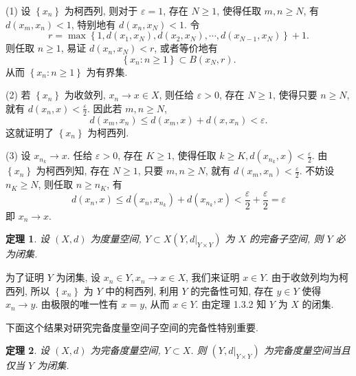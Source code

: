 \documentclass[openany]{ctexbook}
\makeatletter
\theoremstyle{kaiti}
\newtheorem{theorem}{定理}[section]
\theoremstyle{normal}
\renewenvironment{proof}[1][\proofname]{\par
    \pushQED{\qed}%
    \normalfont \topsep6\p@\@plus6\p@\relax
    \trivlist
    \item\relax
    {\heiti #1}\hspace{2\labelsep}\ignorespaces
  }{%
    \popQED\endtrivlist\@endpefalse
  }
\makeatother
\begin{document}
\begin{proof}
(1) 设 $\left\{x_n\right\}$ 为柯西列, 则对于 $\varepsilon=1$, 存在 $N \geqslant 1$, 使得任取 $m, n \geqslant N$, 有 $d\left(x_m, x_n\right)<1$, 特别地有 $d\left(x_n, x_{N}\right)<1$. 令
$$
r=\max\left\{1, d\left(x_1, x_{N}\right), d\left(x_2, x_{N}\right), \cdots, d\left(x_{N-1}, x_{N}\right)\right\}+1.
$$
则任取 $n \geqslant 1$, 易证 $d\left(x_n, x_{N}\right)<r$, 或者等价地有
$$
\left\{x_n: n \geqslant 1\right\} \subset B\left(x_{N}, r\right).
$$
从而 $\left\{x_n: n \geqslant 1\right\}$ 为有界集.

(2) 若 $\left\{x_n\right\}$ 为收敛列, $x_n \rightarrow x \in X$, 则任给 $\varepsilon>0$, 存在 $N \geqslant 1$, 使得只要 $n \geqslant N$, 就有 $d\left(x_n, x\right)<\frac{\varepsilon}{2}$. 因此若 $m, n \geqslant N$,
$$
d\left(x_m, x_n\right) \leqslant d\left(x_m, x\right)+d\left(x, x_n\right)<\varepsilon.
$$
这就证明了 $\left\{x_n\right\}$ 为柯西列.

(3) 设 $x_{n_{k}} \rightarrow x$. 任给 $\varepsilon>0$, 存在 $K \geqslant 1$, 使得任取 $k \geqslant K, d\left(x_{n_{k}}, x\right)<\frac{\varepsilon}{2}$. 由 $\left\{x_n\right\}$ 为柯西列知, 存在 $N \geqslant 1$, 只要 $m, n \geqslant N$, 就有 $d\left(x_m, x_n\right)<\frac{\varepsilon}{2}$. 不妨设 $n_{K} \geqslant N$, 则任取 $n \geqslant n_{K}$, 有
$$
d\left(x_n, x\right) \leqslant d\left(x_n, x_{n_{k}}\right)+d\left(x_{n_{k}}, x\right)<\frac{\varepsilon}{2}+\frac{\varepsilon}{2}=\varepsilon
$$
即 $x_n \rightarrow x$.
\end{proof}

\begin{theorem}
  设 $(X, d)$ 为度量空间, $Y \subset X\left(Y,\left.d\right|_{Y \times Y}\right)$ 为 $X$ 的完备子空间, 则 $Y$ 必为闭集.
\end{theorem}

\begin{proof}
为了证明 $Y$ 为闭集, 设 $x_n \in Y, x_n \rightarrow x \in X$, 我们来证明 $x \in Y$. 由于收敛列均为柯西列, 所以 $\left\{x_n\right\}$ 为 $Y$ 中的柯西列, 利用 $Y$ 的完备性可知, 存在 $y \in Y$ 使得 $x_n \rightarrow y$. 由极限的唯一性有 $x=y$, 从而 $x \in Y$. 由定理 1.3.2 知 $Y$ 为 $X$ 的闭集.
\end{proof}

下面这个结果对研究完备度量空间子空间的完备性特别重要.

\begin{theorem}
  设 $(X, d)$ 为完备度量空间, $Y \subset X$. 则 $\left(Y,\left.d\right|_{Y \times Y}\right)$ 为完备度量空间当且仅当 $Y$ 为闭集.
\end{theorem}
\end{document}
